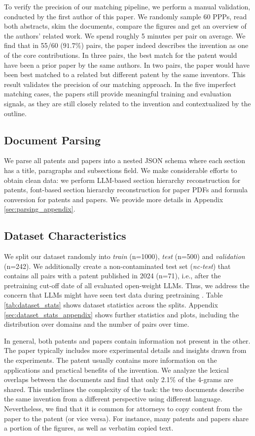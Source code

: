 To verify the precision of our matching pipeline, we perform a manual validation, conducted by the first author of this paper.
We randomly sample 60 PPPs, read both abstracts, skim the documents, compare the figures and get an overview of the authors' related work. We spend roughly 5 minutes per pair on average.
We find that in 55/60 ($91.7\%$) pairs, the paper indeed describes the invention as one of the core contributions.
In three pairs, the best match for the patent would have been a prior paper by the same authors.
In two pairs, the paper would have been best matched to a related but different patent by the same inventors.
This result validates the precision of our matching approach.
In the five imperfect matching cases, the papers still provide meaningful training and evaluation signals, as they are still closely related to the invention and contextualized by the outline.

\subsection{Document Parsing}

We parse all patents and papers into a nested JSON schema where each section has a title, paragraphs and subsections field. We make considerable efforts to obtain clean data: we perform LLM-based section hierarchy reconstruction for patents, font-based section hierarchy reconstruction for paper PDFs and formula conversion for patents and papers. We provide more details in Appendix \ref{sec:parsing_appendix}.


\subsection{Dataset Characteristics}

We split our dataset randomly into \textit{train} (n=1000), \textit{test} (n=500) and \textit{validation} (n=242). We additionally create a non-contaminated test set (\textit{nc-test}) that contains all pairs with a patent published in 2024 (n=71), i.e., after the pretraining cut-off date of all evaluated open-weight LLMs. 
Thus, we address the concern that LLMs might have seen test data during pretraining \cite{ravaut2024much}.
Table \ref{tab:dataset_stats} shows dataset statistics across the splits. Appendix \ref{sec:dataset_stats_appendix} shows further statistics and plots, including the distribution over domains and the number of pairs over time.

In general, both patents and papers contain information not present in the other.
The paper typically includes more experimental details and insights drawn from the experiments.
The patent usually contains more information on the applications and practical benefits of the invention.
We analyze the lexical overlaps between the documents and find that only 2.1\% of the 4-grams are shared.
This underlines the complexity of the task: the two documents describe the same invention from a different perspective using different language.
Nevertheless, we find that it is common for attorneys to copy content from the paper to the patent (or vice versa). 
For instance, many patents and papers share a portion of the figures, as well as verbatim copied text.
